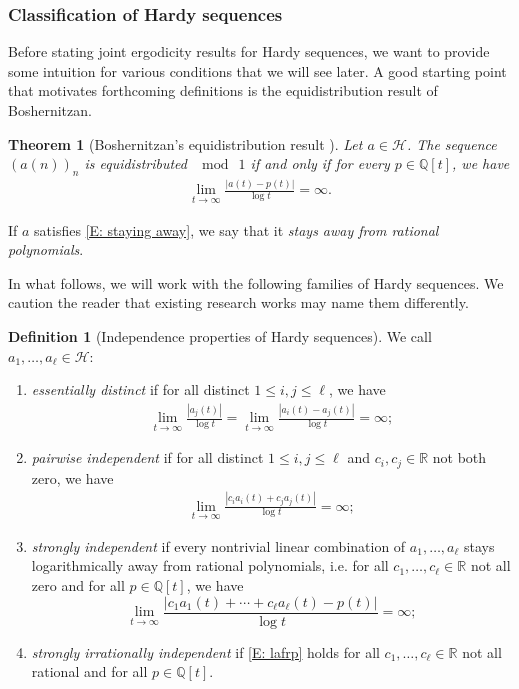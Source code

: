 \documentclass[11pt]{amsart}
\newtheorem{theorem}[lemma]{Theorem}
\theoremstyle{definition}
\newtheorem{definition}[lemma]{Definition}
\newcommand{\Q}{{\mathbb Q}}
\newcommand{\R}{{\mathbb R}}
\newcommand{\CH}{{\mathcal H}}
\newcommand{\1}{{\mathbf{1}}}
\begin{document}
\subsubsection{Classification of Hardy sequences}
Before stating joint ergodicity results for Hardy sequences, we want to provide some intuition for various conditions that we will see later. A good starting point that motivates forthcoming definitions is the equidistribution result of Boshernitzan.
\begin{theorem}[Boshernitzan's equidistribution result {\cite[Theorem 1.3]{Boshernitzan-equidistribution}}]\label{T: Boshernitzan}
    Let $a\in\mathcal{H}$. The sequence $(a(n))_{n}$ is equidistributed $\mod~\!1$ if and only if for every $p\in \Q[t]$, we have
    \begin{align}\label{E: staying away}
        \lim_{t\to \infty}\frac{|a(t)-p(t)|}{\log t}=\infty.
    \end{align}
\end{theorem}
If $a$ satisfies \eqref{E: staying away}, we say that it \emph{stays away from rational polynomials}.

In what follows, we will work with the following families of Hardy sequences. We caution the reader that existing research works may name them differently.
\begin{definition}[Independence properties of Hardy sequences]\label{D: independence}
We call $a_1, \ldots, a_\ell\in\CH$:
\begin{enumerate}
\item \emph{essentially distinct} if for all distinct $1\leq i, j\leq \ell$, we have
\begin{align*}
    \lim_{t\to\infty}\frac{|a_j(t)|}{\log t} = \lim_{t\to\infty}\frac{|a_i(t)-a_j(t)|}{\log t}=\infty;
\end{align*}

\item \emph{pairwise independent} if for all distinct $1\leq i, j\leq\ell$ and $c_i, c_j\in\R$ not both zero, we have
\begin{align*}
    \lim_{t\to\infty}\frac{|c_i a_i(t) + c_j a_j(t)|}{\log t}=\infty;
\end{align*}
\item \emph{strongly independent} if every nontrivial linear combination of $a_1, \ldots, a_\ell$ stays logarithmically away from rational polynomials, i.e. for all $c_1, \ldots, c_\ell\in\R$ not all zero and for all $p\in\Q[t]$, we have
\begin{equation}\label{E: lafrp}
    \lim_{t\to\infty}\frac{|c_1 a_1(t) + \cdots + c_\ell a_\ell(t) - p(t)|}{\log t} = \infty;
\end{equation}
    \item \emph{strongly irrationally independent} if \eqref{E: lafrp} holds for all $c_1, \ldots, c_\ell\in\R$ not all rational and for all $p\in\Q[t]$.
\end{enumerate}
\end{definition}
\end{document}
